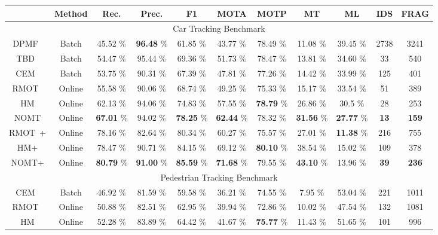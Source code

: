 \documentclass[10pt,twocolumn,letterpaper]{article}
\begin{document}
\begin{table*}
\begin{center}
{\scriptsize
\begin{tabular}{| c || c || c | c | c || c | c | c | c | c | c |}
\hline
& Method & Rec.  & Prec.  & F1  & MOTA  & MOTP  & MT  & ML  & IDS  & FRAG  \\ 
\hline
\hline
\multicolumn{11}{|c|}{Car Tracking Benchmark} \\
\hline
DPMF~\cite{Pirsiavash_CVPR_11} & Batch & 45.52 \% & {\bf 96.48} \% & 61.85 \% & 43.77 \% & 78.49 \% & 11.08 \% & 39.45 \% & 2738 & 3241 \\
TBD~\cite{Geiger2014PAMI} & Batch & 54.47 \% & 95.44 \% & 69.36 \% & 51.73 \% & 78.47 \% & 13.81 \% & 34.60 \% & 33 & 540 \\
CEM~\cite{Milan:2014:CEM} & Batch & 53.75 \% & 90.31 \% & 67.39 \% & 47.81 \% & 77.26 \% & 14.42 \% & 33.99 \% & 125 & 401 \\
RMOT~\cite{YoonWACV2015} & Online & 55.58 \% & 90.06 \% & 68.74 \% & 49.25 \% & 75.33 \% & 15.17 \% & 33.54 \% & 51 & 389 \\
\hline
HM & Online & 62.13 \% & 94.06 \% & 74.83 \% & 57.55 \% & {\bf 78.79} \% & 26.86 \% & 30.5 \% & 28 & 253 \\
NOMT & Online & {\bf 67.01 } \% & 94.02 \% & {\bf 78.25} \% & {\bf 62.44}  \% & 78.32 \% & {\bf 31.56} \% & {\bf 27.77} \% & {\bf 13} & {\bf 159} \\
\hline
\hline
RMOT~\cite{YoonWACV2015}+\cite{wang2013regionlets} & Online & 78.16 \% & 82.64 \% & 80.34 \% & 60.27 \% & 75.57 \% & 27.01 \% & {\bf 11.38} \% & 216 & 755 \\
\hline
HM+\cite{wang2013regionlets} & Online & 78.47  \% & 90.71 \% & 84.15 \% & 69.12  \% & {\bf 80.10} \% & 38.54 \% & 15.02 \% & 109 & 378\\
NOMT+\cite{wang2013regionlets} & Online & {\bf 80.79}  \% & {\bf 91.00} \% & {\bf 85.59} \% & {\bf 71.68}  \% & 79.55 \% & {\bf 43.10} \% & 13.96 \% & {\bf 39} & {\bf 236}\\
\hline
\hline
\multicolumn{11}{|c|}{Pedestrian Tracking Benchmark} \\
\hline
CEM~\cite{Milan:2014:CEM} & Batch & 46.92 \% & 81.59 \% & 59.58 \% & 36.21 \% & 74.55 \% & 7.95 \% & 53.04 \% & 221 & 1011 \\
RMOT~\cite{YoonWACV2015} & Online & 50.88 \% & 82.51 \% & 62.95 \% & 39.94 \% & 72.86 \% & 10.02 \% & 47.54 \% & 132 & 1081 \\
\hline
HM & Online & 52.28 \% & 83.89 \% & 64.42 \% & 41.67 \% & {\bf 75.77} \% & 11.43 \% & 51.65 \% & 101 & 996 \\

\end{tabular}}
\end{center}
\end{table*}
\end{document}
